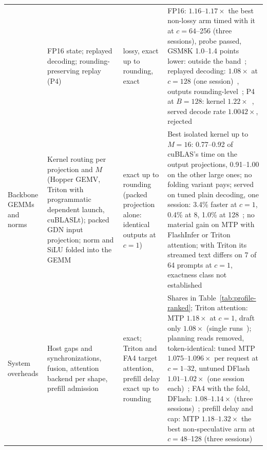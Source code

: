 \begin{table}[htbp]
\begin{tabularx}{\linewidth}{@{}P{2.5cm}YP{1.7cm}P{5.7cm}@{}}
& FP16 state; replayed decoding; rounding-preserving replay (P4) & lossy, exact up to rounding, exact & FP16: $1.16$--$1.17\times$ the best non-lossy arm timed with it at $c=64$--256 (three sessions), probe passed, GSM8K 1.0--1.4 points lower: outside the band~; replayed decoding: $1.08\times$ at $c=128$ (one session)~, outputs rounding-level~; P4 at $B=128$: kernel $1.22\times$~, served decode rate $1.0042\times$, rejected~\\
Backbone GEMMs and norms & Kernel routing per projection and $M$ (Hopper GEMV, Triton with programmatic dependent launch, cuBLASLt); packed GDN input projection; norm and SiLU folded into the GEMM & exact up to rounding (packed projection alone: identical outputs at $c=1$) & Best isolated kernel up to $M=16$: 0.77--0.92 of cuBLAS's time on the output projections, 0.91--1.00 on the other large ones; no folding variant pays; served on tuned plain decoding, one session: 3.4\% faster at $c=1$, 0.4\% at 8, 1.0\% at 128~; no material gain on MTP with FlashInfer or Triton attention; with Triton its streamed text differs on 7 of 64 prompts at $c=1$, exactness class not established~\\
System overheads & Host gaps and synchronizations, fusion, attention backend per shape, prefill admission & exact; Triton and FA4 target attention, prefill delay exact up to rounding & Shares in Table~\ref{tab:profile-ranked}; Triton attention: MTP $1.18\times$ at $c=1$, draft only $1.08\times$ (single runs~); planning reads removed, token-identical: tuned MTP $1.075$--$1.096\times$ per request at $c=1$--32, untuned DFlash $1.01$--$1.02\times$ (one session each)~; FA4 with the fold, DFlash: $1.08$--$1.14\times$ (three sessions)~; prefill delay and cap: MTP $1.18$--$1.32\times$ the best non-speculative arm at $c=48$--128 (three sessions)~\\\bottomrule
\end{tabularx}
\end{table}

